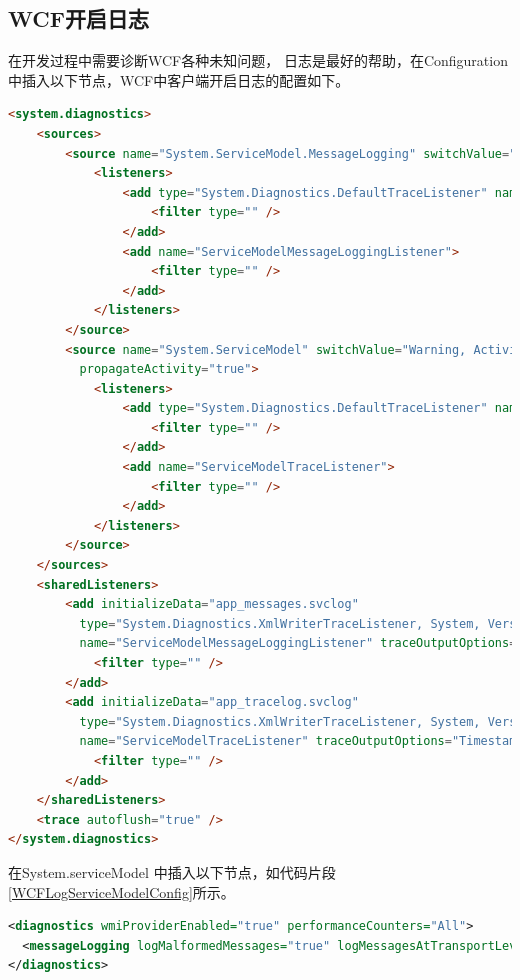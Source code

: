 \documentclass{book}
\begin{document}
\subsection{WCF开启日志}

在开发过程中需要诊断WCF各种未知问题，
日志是最好的帮助，在Configuration中插入以下节点，WCF中客户端开启日志的配置如下。

\begin{lstlisting}[language=HTML]
<system.diagnostics>
    <sources>
        <source name="System.ServiceModel.MessageLogging" switchValue="Warning, ActivityTracing">
            <listeners>
                <add type="System.Diagnostics.DefaultTraceListener" name="Default">
                    <filter type="" />
                </add>
                <add name="ServiceModelMessageLoggingListener">
                    <filter type="" />
                </add>
            </listeners>
        </source>
        <source name="System.ServiceModel" switchValue="Warning, ActivityTracing"
          propagateActivity="true">
            <listeners>
                <add type="System.Diagnostics.DefaultTraceListener" name="Default">
                    <filter type="" />
                </add>
                <add name="ServiceModelTraceListener">
                    <filter type="" />
                </add>
            </listeners>
        </source>
    </sources>
    <sharedListeners>
        <add initializeData="app_messages.svclog"
          type="System.Diagnostics.XmlWriterTraceListener, System, Version=2.0.0.0, Culture=neutral, PublicKeyToken=b77a5c561934e089"
          name="ServiceModelMessageLoggingListener" traceOutputOptions="Timestamp">
            <filter type="" />
        </add>
        <add initializeData="app_tracelog.svclog"
          type="System.Diagnostics.XmlWriterTraceListener, System, Version=2.0.0.0, Culture=neutral, PublicKeyToken=b77a5c561934e089"
          name="ServiceModelTraceListener" traceOutputOptions="Timestamp">
            <filter type="" />
        </add>
    </sharedListeners>
    <trace autoflush="true" />
</system.diagnostics>
\end{lstlisting}

在System.serviceModel 中插入以下节点，如代码片段\ref{WCFLogServiceModelConfig}所示。

\begin{lstlisting}[language=XML,caption=WCF日志serviceModel节点配置,label=WCFLogServiceModelConfig]
<diagnostics wmiProviderEnabled="true" performanceCounters="All">
  <messageLogging logMalformedMessages="true" logMessagesAtTransportLevel="true" />
</diagnostics>
\end{lstlisting}
\end{document}
